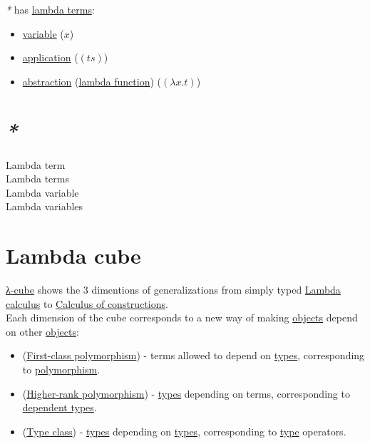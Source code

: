 \documentclass[a4paper,14pt,oneside]{book}
\begin{document}
\emph{*} has \hyperref[org68bc50f]{lambda terms}:\\
\begin{itemize}
\item \hyperref[orgd43afbd]{variable} (\(x\))\\
\item \hyperref[orgf09110d]{application} (\((ts)\))\\
\item \hyperref[orgd003800]{abstraction} (\hyperref[orgdb73cc8]{lambda function}) (\((\lambda x . t)\))\\
\end{itemize}

\section{\emph{*}}
\label{sec:orgcf06cbc}

\label{orgc02e81e}Lambda term\\
\label{org68bc50f}Lambda terms\\
\label{org093ebbe}Lambda variable\\
\label{org28088ce}Lambda variables\\

\section{\label{org9a31d1b}Lambda cube}
\label{sec:org8c1bc86}
\hyperref[orgff6772c]{λ-cube} shows the 3 dimentions of generalizations from simply typed \hyperref[orgb662a27]{Lambda calculus} to \hyperref[orgc61b184]{Calculus of constructions}.\\

Each dimension of the cube corresponds to a new way of making \hyperref[orgd42a7f2]{objects} depend on other \hyperref[orgd42a7f2]{objects}:\\
\begin{itemize}
\item (\hyperref[orgd8c1f4d]{First-class polymorphism}) - terms allowed to depend on \hyperref[org560d3e8]{types}, corresponding to \hyperref[org7392ac7]{polymorphism}.\\
\item (\hyperref[org51c5482]{Higher-rank polymorphism}) - \hyperref[org560d3e8]{types} depending on terms, corresponding to \hyperref[org39c2fed]{dependent types}.\\
\item (\hyperref[orgf587b3a]{Type class}) - \hyperref[org560d3e8]{types} depending on \hyperref[org560d3e8]{types}, corresponding to \hyperref[orgc4a7610]{type} operators.\\
\end{itemize}
\end{document}
